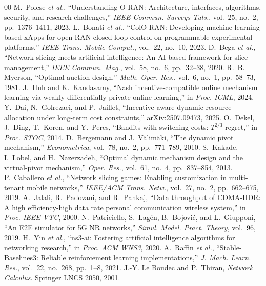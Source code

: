 \documentclass[conference]{IEEEtran}
\theoremstyle{definition}
\theoremstyle{remark}
\begin{document}
\begin{thebibliography}{00}
 M.~Polese \emph{et al.}, ``Understanding O-RAN: Architecture, interfaces, algorithms, security, and research challenges,'' \emph{IEEE Commun. Surveys Tuts.}, vol.~25, no.~2, pp.~1376--1411, 2023.
 L.~Bonati \emph{et al.}, ``ColO-RAN: Developing machine learning-based xApps for open RAN closed-loop control on programmable experimental platforms,'' \emph{IEEE Trans. Mobile Comput.}, vol.~22, no.~10, 2023.
 D.~Bega \emph{et al.}, ``Network slicing meets artificial intelligence: An AI-based framework for slice management,'' \emph{IEEE Commun. Mag.}, vol.~58, no.~6, pp.~32--38, 2020.
 R.~B. Myerson, ``Optimal auction design,'' \emph{Math. Oper. Res.}, vol.~6, no.~1, pp.~58--73, 1981.
 J.~Huh and K.~Kandasamy, ``Nash incentive-compatible online mechanism learning via weakly differentially private online learning,'' in \emph{Proc. ICML}, 2024.
 Y.~Dai, N.~Golrezaei, and P.~Jaillet, ``Incentive-aware dynamic resource allocation under long-term cost constraints,'' arXiv:2507.09473, 2025.
 O.~Dekel, J.~Ding, T.~Koren, and Y.~Peres, ``Bandits with switching costs: $T^{2/3}$ regret,'' in \emph{Proc. STOC}, 2014.
 D.~Bergemann and J.~V\"alim\"aki, ``The dynamic pivot mechanism,'' \emph{Econometrica}, vol.~78, no.~2, pp.~771--789, 2010.
 S.~Kakade, I.~Lobel, and H.~Nazerzadeh, ``Optimal dynamic mechanism design and the virtual-pivot mechanism,'' \emph{Oper. Res.}, vol.~61, no.~4, pp.~837--854, 2013.
 P.~Caballero \emph{et al.}, ``Network slicing games: Enabling customization in multi-tenant mobile networks,'' \emph{IEEE/ACM Trans. Netw.}, vol.~27, no.~2, pp.~662--675, 2019.
 A.~Jalali, R.~Padovani, and R.~Pankaj, ``Data throughput of CDMA-HDR: A high efficiency-high data rate personal communication wireless system,'' in \emph{Proc. IEEE VTC}, 2000.
 N.~Patriciello, S.~Lag\'en, B.~Bojovi\'c, and L.~Giupponi, ``An E2E simulator for 5G NR networks,'' \emph{Simul. Model. Pract. Theory}, vol.~96, 2019.
 H.~Yin \emph{et al.}, ``ns3-ai: Fostering artificial intelligence algorithms for networking research,'' in \emph{Proc. ACM WNS3}, 2020.
 A.~Raffin \emph{et al.}, ``Stable-Baselines3: Reliable reinforcement learning implementations,'' \emph{J. Mach. Learn. Res.}, vol.~22, no.~268, pp.~1--8, 2021.
 J.-Y. Le Boudec and P.~Thiran, \emph{Network Calculus}. Springer LNCS 2050, 2001.
\end{thebibliography}
\end{document}
